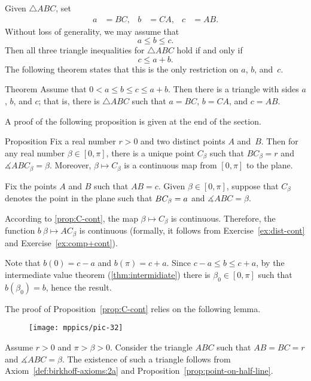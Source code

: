 Given $\triangle ABC$, set 
\begin{align*}
a&=BC,
&
b&=CA,
&
c&=AB.
\end{align*}
Without loss of generality, we may assume that 
\[a\le b \le c.\]
Then all three triangle inequalities for $\triangle ABC$
hold if and only if 
\[c\le a+b.\]
The following theorem states that this is the only restriction on $a$, $b$, and~$c$.

\begin{thm}[\abs]{Theorem}\label{thm:abc}
Assume that $0<a\le b\le c\le a+b$.
Then there is a triangle with sides $a$, $b$, and $c$;
that is, there is $\triangle ABC$ 
such that $a=BC$, $b=CA$, and $c=AB$.
\end{thm}

A proof of the following proposition is given at the end of the section.

\begin{thm}[\abs]{Proposition}\label{prop:C-cont}
Fix a real number $r>0$ 
and two distinct points $A$ and~$B$.
Then for 
any real number $\beta\in [0,\pi]$,
there is a unique point $C_\beta$ such that $BC_\beta=r$
and $\measuredangle ABC_\beta=\beta$.
Moreover, $\beta\mapsto C_\beta$ 
is a continuous map from $[0,\pi]$ to the plane.
\end{thm}

\label{page:proof:thm:abc}
Fix the points $A$ and $B$ such that $AB=c$.
Given $\beta\in [0,\pi]$,
suppose that $C_\beta$ denotes the point in the plane such that $BC_\beta\z=a$ and $\measuredangle ABC=\beta$.

According to \ref{prop:C-cont},
the map
$\beta\mapsto C_\beta$ is continuous.
Therefore, the function $b\:\beta\mapsto AC_\beta$ is continuous
(formally, it follows from Exercise~\ref{ex:dist-cont} and Exercise~\ref{ex:comp+cont}).

Note that $b(0)=c-a$ and $b(\pi)=c+a$.
Since $c-a\le b\le c+a$,
by the intermediate value theorem (\ref{thm:intermidiate})
there is $\beta_0\in[0,\pi]$ such that
$b(\beta_0)=b$,
hence the result. 
\qeds

The proof of Proposition~\ref{prop:C-cont} relies on the following lemma.

\begin{wrapfigure}{o}{27mm}
\vskip2mm
\centering
\texttt{[image: mppics/pic-32]}
\end{wrapfigure}

Assume $r>0$ and $\pi>\beta>0$.
Consider the triangle $ABC$ such that 
$AB=BC=r$ and $\measuredangle ABC=\beta$.
The existence of such a triangle follows from Axiom~\ref{def:birkhoff-axioms:2a} and Proposition~\ref{prop:point-on-half-line}.


